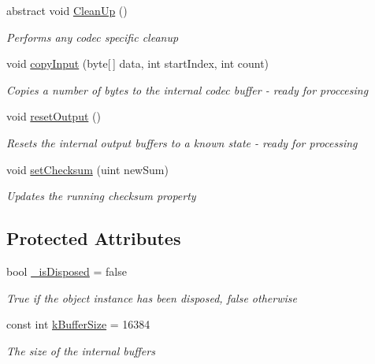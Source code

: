 \begin{DoxyCompactItemize}
abstract void \hyperlink{class_dot_z_lib_1_1_codec_base_aa0ded075105c5cf6f5f0d61928c90ca6}{Clean\+Up} ()
\begin{DoxyCompactList}\small\item\em Performs any codec specific cleanup \end{DoxyCompactList}\item 
void \hyperlink{class_dot_z_lib_1_1_codec_base_a8c827f091195356490e7f8b69e0546a7}{copy\+Input} (byte\mbox{[}$\,$\mbox{]} data, int start\+Index, int count)
\begin{DoxyCompactList}\small\item\em Copies a number of bytes to the internal codec buffer -\/ ready for proccesing \end{DoxyCompactList}\item 
void \hyperlink{class_dot_z_lib_1_1_codec_base_a801b625073b21aeaab52ebf9e96dd9c9}{reset\+Output} ()
\begin{DoxyCompactList}\small\item\em Resets the internal output buffers to a known state -\/ ready for processing \end{DoxyCompactList}\item 
void \hyperlink{class_dot_z_lib_1_1_codec_base_a5dfa2dddf3ac857652af7fd8e3d2034d}{set\+Checksum} (uint new\+Sum)
\begin{DoxyCompactList}\small\item\em Updates the running checksum property \end{DoxyCompactList}\end{DoxyCompactItemize}
\subsection*{Protected Attributes}
\begin{DoxyCompactItemize}
\item 
bool \hyperlink{class_dot_z_lib_1_1_codec_base_a9dd3f18cc5e81e1a871279abeda2da84}{\+\_\+is\+Disposed} = false
\begin{DoxyCompactList}\small\item\em True if the object instance has been disposed, false otherwise \end{DoxyCompactList}\item 
const int \hyperlink{class_dot_z_lib_1_1_codec_base_a4e516f01a0660be7dbbbed22d1f6b595}{k\+Buffer\+Size} = 16384
\begin{DoxyCompactList}\small\item\em The size of the internal buffers \end{DoxyCompactList}\end{DoxyCompactItemize}
